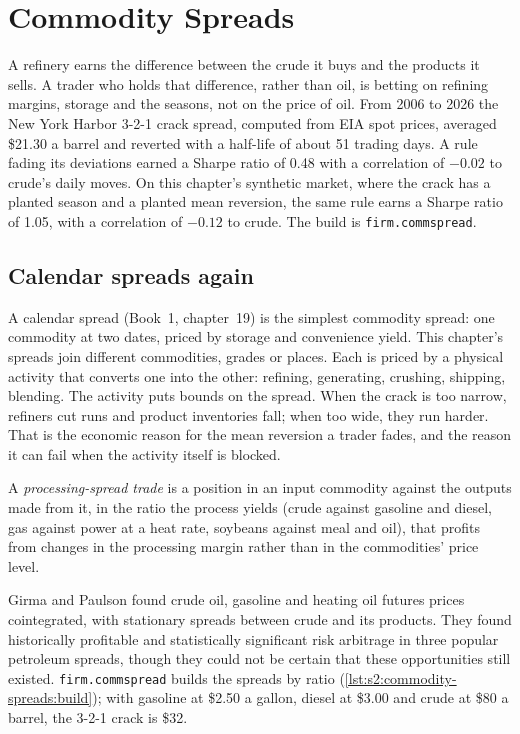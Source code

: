 \chapter{Commodity Spreads}\label{ch:s2:commodity-spreads}

A refinery earns the difference between the crude it buys and the products it sells. A trader who holds that difference, rather than oil, is betting on
refining margins, storage and the seasons, not on the price of oil. From 2006 to 2026 the New York Harbor 3-2-1 crack spread, computed from EIA spot
prices, averaged \$21.30 a barrel and reverted with a half-life of about 51 trading days. A rule fading its deviations earned a Sharpe ratio of 0.48
with a correlation of $-0.02$ to crude's daily moves. On this chapter's synthetic market, where the crack has a planted season and a planted
mean reversion, the same rule earns a Sharpe ratio of 1.05, with a correlation of $-0.12$ to crude. The build is \texttt{firm.commspread}.

\section{Calendar spreads again}

A calendar spread (Book~1, chapter~19) is the simplest commodity spread: one commodity at two dates, priced by storage and convenience yield. This
chapter's spreads join different commodities, grades or places. Each is priced by a physical activity that converts one into the other: refining,
generating, crushing, shipping, blending. The activity puts bounds on the spread. When the crack is too narrow, refiners cut runs and product
inventories fall; when too wide, they run harder. That is the economic reason for the mean reversion a trader fades, and the reason it can fail when
the activity itself is blocked.

\begin{definition}\label{def:s2:commodity-spreads:processing}
A \emph{processing-spread trade} is a position in an input commodity against the outputs made from it, in the ratio the
process yields (crude against gasoline and diesel, gas against power at a heat rate, soybeans against meal and oil), that profits from changes in the
processing margin rather than in the commodities' price level.
\end{definition}

Girma and Paulson found crude oil, gasoline and heating oil futures prices cointegrated, with stationary spreads between crude and its products. They
found historically profitable and statistically significant risk arbitrage in three popular petroleum spreads, though they could not be certain that
these opportunities still existed. \texttt{firm.commspread} builds the spreads by ratio
(\cref{lst:s2:commodity-spreads:build}); with gasoline at \$2.50 a gallon, diesel at \$3.00 and crude at \$80 a barrel, the 3-2-1 crack is \$32.

